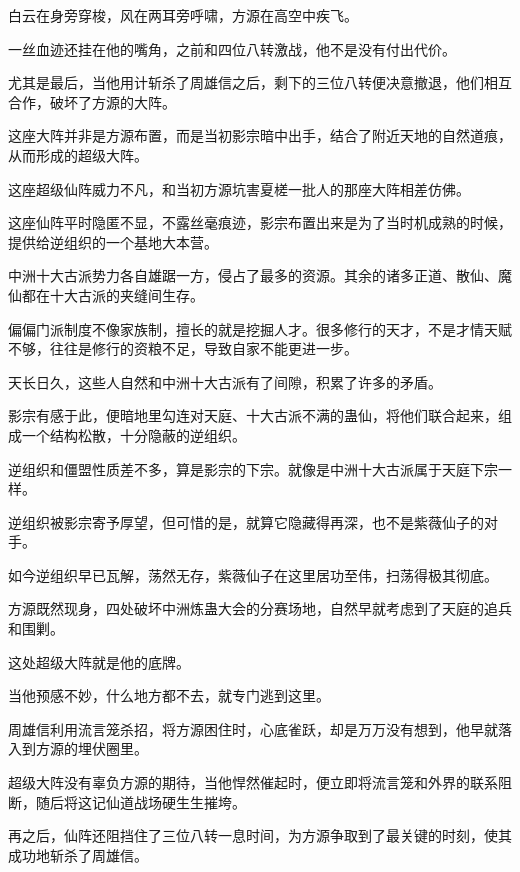 
\begin{this_body}



白云在身旁穿梭，风在两耳旁呼啸，方源在高空中疾飞。

一丝血迹还挂在他的嘴角，之前和四位八转激战，他不是没有付出代价。

尤其是最后，当他用计斩杀了周雄信之后，剩下的三位八转便决意撤退，他们相互合作，破坏了方源的大阵。

这座大阵并非是方源布置，而是当初影宗暗中出手，结合了附近天地的自然道痕，从而形成的超级大阵。

这座超级仙阵威力不凡，和当初方源坑害夏槎一批人的那座大阵相差仿佛。

这座仙阵平时隐匿不显，不露丝毫痕迹，影宗布置出来是为了当时机成熟的时候，提供给逆组织的一个基地大本营。

中洲十大古派势力各自雄踞一方，侵占了最多的资源。其余的诸多正道、散仙、魔仙都在十大古派的夹缝间生存。

偏偏门派制度不像家族制，擅长的就是挖掘人才。很多修行的天才，不是才情天赋不够，往往是修行的资粮不足，导致自家不能更进一步。

天长日久，这些人自然和中洲十大古派有了间隙，积累了许多的矛盾。

影宗有感于此，便暗地里勾连对天庭、十大古派不满的蛊仙，将他们联合起来，组成一个结构松散，十分隐蔽的逆组织。

逆组织和僵盟性质差不多，算是影宗的下宗。就像是中洲十大古派属于天庭下宗一样。

逆组织被影宗寄予厚望，但可惜的是，就算它隐藏得再深，也不是紫薇仙子的对手。

如今逆组织早已瓦解，荡然无存，紫薇仙子在这里居功至伟，扫荡得极其彻底。

方源既然现身，四处破坏中洲炼蛊大会的分赛场地，自然早就考虑到了天庭的追兵和围剿。

这处超级大阵就是他的底牌。

当他预感不妙，什么地方都不去，就专门逃到这里。

周雄信利用流言笼杀招，将方源困住时，心底雀跃，却是万万没有想到，他早就落入到方源的埋伏圈里。

超级大阵没有辜负方源的期待，当他悍然催起时，便立即将流言笼和外界的联系阻断，随后将这记仙道战场硬生生摧垮。

再之后，仙阵还阻挡住了三位八转一息时间，为方源争取到了最关键的时刻，使其成功地斩杀了周雄信。


\end{this_body}
